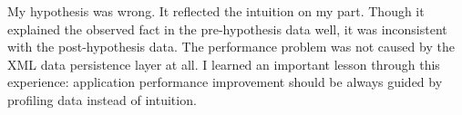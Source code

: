 My hypothesis was wrong. It reflected the intuition on my part. Though it explained the observed fact in the pre-hypothesis data well, it was inconsistent with the post-hypothesis data. The performance problem was not caused by the XML data persistence layer at all. I learned an important lesson through this experience: application performance improvement should be always guided by profiling data instead of intuition.










%
%
%
